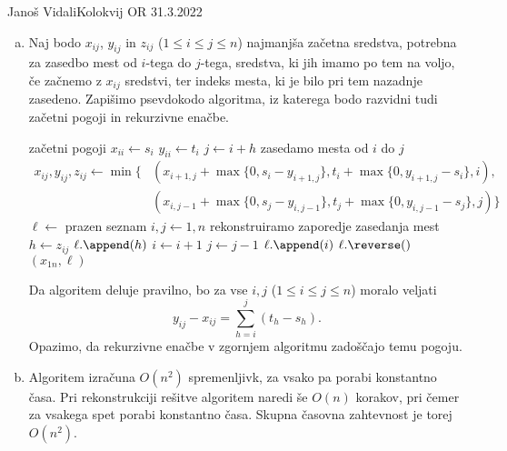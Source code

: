 \begin{naloga}{Janoš Vidali}{Kolokvij OR 31.3.2022}
\begin{odgovor}
\begin{enumerate}[(a)]
\item Naj bodo $x_{ij}$, $y_{ij}$ in $z_{ij}$ ($1 \le i \le j \le n$)
najmanjša začetna sredstva,
potrebna za zasedbo mest od $i$-tega do $j$-tega,
sredstva, ki jih imamo po tem na voljo,
če začnemo z $x_{ij}$ sredstvi,
ter indeks mesta, ki je bilo pri tem nazadnje zasedeno.
Zapišimo psevdokodo algoritma,
iz katerega bodo razvidni tudi začetni pogoji in rekurzivne enačbe.
\begin{small}
\begin{algorithmic}
	 \hfill začetni pogoji
		\State $x_{ii} \gets s_i$
		\State $y_{ii} \gets t_i$
	\EndFor
			\State $j \gets i+h$ \hfill zasedamo mesta od $i$ do $j$
			\State $\begin{aligned}
			x_{ij}, y_{ij}, z_{ij} \gets \min\{
			&{} (x_{i+1, j} + \max\{0, s_i - y_{i+1, j}\}, t_i + \max\{0, y_{i+1, j} - s_i\}, i), \\
			&{} (x_{i, j-1} + \max\{0, s_j - y_{i, j-1}\}, t_j + \max\{0, y_{i, j-1} - s_j\}, j)\}
			\end{aligned}$
		\EndFor
	\EndFor
	\State $\ell \gets$ prazen seznam
	\State $i, j \gets 1, n$
	 \hfill rekonstruiramo zaporedje zasedanja mest
		\State $h \gets z_{ij}$
		\State $\ell.\append(h)$
			\State $i \gets i+1$
		\Else
			\State $j \gets j-1$
		\EndIf
	\EndWhile
	\State $\ell.\append(i)$
	\State $\ell.\reverse()$
	\State \Return $(x_{1n}, \ell)$
\EndFunction
\end{algorithmic}
\end{small}

Da algoritem deluje pravilno,
bo za vse $i, j$ ($1 \le i \le j \le n$) moralo veljati
$$
y_{ij} - x_{ij} = \sum_{h=i}^j (t_h - s_h).
$$
Opazimo, da rekurzivne enačbe v zgornjem algoritmu zadoščajo temu pogoju.

\item Algoritem izračuna $O(n^2)$ spremenljivk,
za vsako pa porabi konstantno časa.
Pri rekonstrukciji rešitve algoritem naredi še $O(n)$ korakov,
pri čemer za vsakega spet porabi konstantno časa.
Skupna časovna zahtevnost je torej $O(n^2)$.


\end{enumerate}
\end{odgovor}
\end{naloga}
